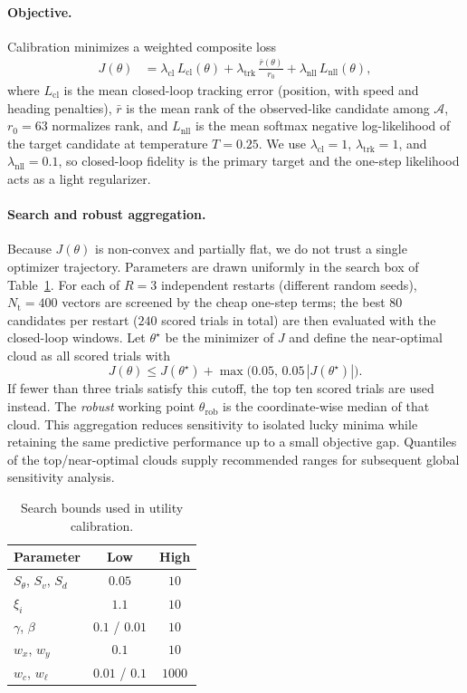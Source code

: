 \paragraph{Objective.}
Calibration minimizes a weighted composite loss
\begin{equation}
\begin{aligned}
J(\theta)
&=
\lambda_{\mathrm{cl}}\,L_{\mathrm{cl}}(\theta)
+
\lambda_{\mathrm{trk}}\,\frac{\bar r(\theta)}{r_0}
+
\lambda_{\mathrm{nll}}\,L_{\mathrm{nll}}(\theta),
\end{aligned}
\label{eq:calibration_objective}
\end{equation}
where $L_{\mathrm{cl}}$ is the mean closed-loop tracking error (position, with speed and heading penalties), $\bar r$ is the mean rank of the observed-like candidate among $\mathcal{A}$, $r_0=63$ normalizes rank, and $L_{\mathrm{nll}}$ is the mean softmax negative log-likelihood of the target candidate at temperature $T=0.25$. We use $\lambda_{\mathrm{cl}}=1$, $\lambda_{\mathrm{trk}}=1$, and $\lambda_{\mathrm{nll}}=0.1$, so closed-loop fidelity is the primary target and the one-step likelihood acts as a light regularizer.

\paragraph{Search and robust aggregation.}
Because $J(\theta)$ is non-convex and partially flat, we do not trust a single optimizer trajectory. Parameters are drawn uniformly in the search box of Table~\ref{tab:utility_search_bounds}. For each of $R=3$ independent restarts (different random seeds), $N_{\mathrm{t}}=400$ vectors are screened by the cheap one-step terms; the best $80$ candidates per restart ($240$ scored trials in total) are then evaluated with the closed-loop windows. Let $\theta^\star$ be the minimizer of $J$ and define the near-optimal cloud as all scored trials with
\[
J(\theta)\le J(\theta^\star)+\max\bigl(0.05,\,0.05\,|J(\theta^\star)|\bigr).
\]
If fewer than three trials satisfy this cutoff, the top ten scored trials are used instead. The \emph{robust} working point $\theta_{\mathrm{rob}}$ is the coordinate-wise median of that cloud. This aggregation reduces sensitivity to isolated lucky minima while retaining the same predictive performance up to a small objective gap. Quantiles of the top/near-optimal clouds supply recommended ranges for subsequent global sensitivity analysis.

\begin{table}[t]
\centering
\caption{Search bounds used in utility calibration.}
\label{tab:utility_search_bounds}
\begin{tabular}{lcc}
\toprule
Parameter & Low & High \\
\midrule
$S_\theta$, $S_v$, $S_d$ & $0.05$ & $10$ \\
$\xi_i$ & $1.1$ & $10$ \\
$\gamma$, $\beta$ & $0.1$ / $0.01$ & $10$ \\
$w_x$, $w_y$ & $0.1$ & $10$ \\
$w_c$, $w_\ell$ & $0.01$ / $0.1$ & $1000$ \\
\bottomrule
\end{tabular}
\end{table}


